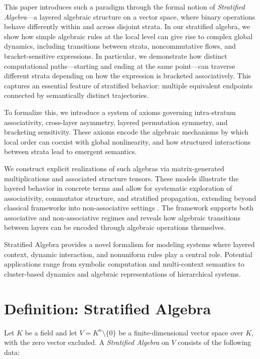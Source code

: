 \documentclass[12pt]{article}
\theoremstyle{definition}
\theoremstyle{plain}
\theoremstyle{remark}
\begin{document}
This paper introduces such a paradigm through the formal notion of \emph{Stratified Algebra}—a layered algebraic structure on a vector space, where binary operations behave differently within and across disjoint strata. In our stratified algebra, we show how simple algebraic rules at the local level can give rise to complex global dynamics, including transitions between strata, noncommutative flows, and bracket-sensitive expressions. In particular, we demonstrate how distinct computational paths—starting and ending at the same point—can traverse different strata depending on how the expression is bracketed associatively. This captures an essential feature of stratified behavior: multiple equivalent endpoints connected by semantically distinct trajectories.

To formalize this, we introduce a system of axioms governing intra-stratum associativity, cross-layer asymmetry, layered permutation symmetry, and bracketing sensitivity. These axioms encode the algebraic mechanisms by which local order can coexist with global nonlinearity, and how structured interactions between strata lead to emergent semantics.

We construct explicit realizations of such algebras via matrix-generated multiplications and associated structure tensors. These models illustrate the layered behavior in concrete terms and allow for systematic exploration of associativity, commutator structure, and stratified propagation, extending beyond classical frameworks into non-associative settings \cite{Schafer1995}. The framework supports both associative and non-associative regimes and reveals how algebraic transitions between layers can be encoded through algebraic operations themselves.

Stratified Algebra provides a novel formalism for modeling systems where layered context, dynamic interaction, and nonuniform rules play a central role. Potential applications range from symbolic computation and multi-context semantics to cluster-based dynamics and algebraic representations of hierarchical systems.

\section{Definition: Stratified Algebra}

Let \( K \) be a field and let \( V = K^n \setminus \{0\} \) be a finite-dimensional vector space over \( K \), with the zero vector excluded. A \emph{Stratified Algebra} on \( V \) consists of the following data:
\end{document}
